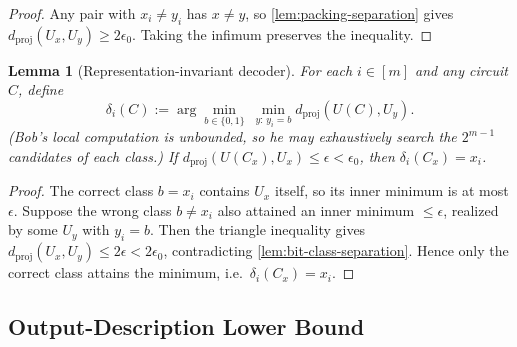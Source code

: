 \documentclass[a4paper,twocolumn,10pt,unpublished]{quantumarticle}
\newtheorem{lemma}{Lemma}
\begin{document}
\begin{proof}
Any pair with $x_i \neq y_i$ has $x \neq y$, so
\cref{lem:packing-separation} gives $d_{\mathrm{proj}}(U_x, U_y) \geq 2\epsilon_0$.
Taking the infimum preserves the inequality.
\end{proof}

\begin{lemma}[Representation-invariant decoder]
\label{lem:decoder}
For each $i \in [m]$ and any circuit $C$, define
\begin{equation}\label{eq:decoder}
\delta_i(C) :=
\arg\min_{b \in \{0,1\}}\ \min_{y:\, y_i = b} d_{\mathrm{proj}}(U(C), U_y).
\end{equation}
(Bob's local computation is unbounded, so he may exhaustively search the
$2^{m-1}$ candidates of each class.) If
$d_{\mathrm{proj}}(U(C_x), U_x) \leq \epsilon < \epsilon_0$, then
$\delta_i(C_x) = x_i$.
\end{lemma}

\begin{proof}
The correct class $b = x_i$ contains $U_x$ itself, so its inner minimum is
at most $\epsilon$. Suppose the wrong class $b \neq x_i$ also attained an
inner minimum $\leq \epsilon$, realized by some $U_y$ with $y_i = b$. Then
the triangle inequality gives
$d_{\mathrm{proj}}(U_x, U_y) \leq 2\epsilon < 2\epsilon_0$, contradicting
\cref{lem:bit-class-separation}. Hence only the correct class attains the
minimum, i.e.\ $\delta_i(C_x) = x_i$.
\end{proof}

\subsection{Output-Description Lower Bound}
\end{document}
